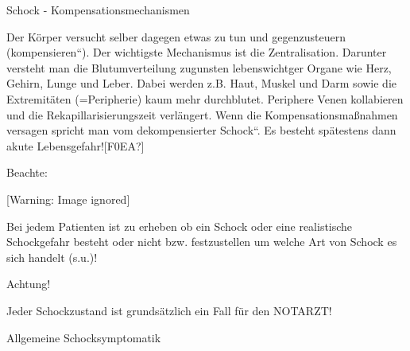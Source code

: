 \documentclass{article}
\begin{document}
Schock -  Kompensationsmechanismen

Der K\"orper versucht selber dagegen etwas zu tun und gegenzusteuern
({\quotedblbase}kompensieren{\textquotedblleft}). Der wichtigste
Mechanismus ist die Zentralisation. Darunter
versteht man die Blutumverteilung zugunsten lebenswichtger Organe wie
Herz, Gehirn, Lunge und Leber. Dabei werden z.B. Haut, Muskel und Darm
sowie die Extremit\"aten (=Peripherie) kaum mehr  durchblutet.
Periphere Venen kollabieren und die Rekapillarisierungszeit
verl\"angert. Wenn die Kompensationsma{\ss}nahmen  versagen spricht man
vom {\quotedblbase}dekompensierter Schock{\textquotedblleft}. Es
besteht sp\"atestens dann akute Lebensgefahr![F0EA?] 

Beachte: 

\begin{center}
 [Warning: Image ignored] %

\end{center}
Bei jedem Patienten ist zu erheben ob ein Schock oder eine realistische
Schockgefahr besteht oder nicht bzw. festzustellen um welche Art von
Schock es sich handelt (s.u.)!

Achtung!

Jeder Schockzustand ist grunds\"atzlich ein Fall f\"ur den NOTARZT!

Allgemeine Schocksymptomatik
\end{document}
